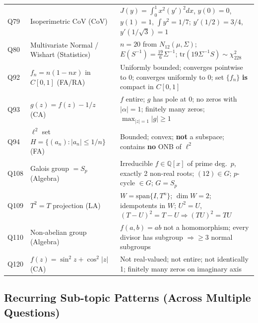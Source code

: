 \documentclass[12pt,a4paper]{article}
\begin{document}
\begin{longtable}{@{}p{0.6cm}p{5.5cm}p{8cm}@{}}
Q79 & Isoperimetric CoV (CoV) & $J(y)=\int_0^1 x^2(y')^2dx$, $y(0)=0$, $y(1)=1$, $\int y^2=1/7$; $y'(1/2)=3/4$, $y'(1/\sqrt{3})=1$ \\
\addlinespace
Q80 & Multivariate Normal / Wishart (Statistics) & $n=20$ from $N_{12}(\mu,\Sigma)$; $E(S^{-1})=\frac{19}{6}\Sigma^{-1}$; $\mathrm{tr}(19\Sigma^{-1}S)\sim\chi^2_{228}$ \\
\addlinespace
Q92 & $f_n=n(1-nx)$ in $C[0,1]$ (FA/RA) & Uniformly bounded; converges pointwise to 0; converges uniformly to 0; set $\{f_n\}$ \textbf{is} compact in $C[0,1]$ \\
\addlinespace
Q93 & $g(z)=f(z)-1/z$ (CA) & $f$ entire; $g$ has pole at 0; no zeros with $|\alpha|=1$; finitely many zeros; $\max_{|z|=1}|g|\ge 1$ \\
\addlinespace
Q94 & $\ell^2$ set $H=\{(a_n):|a_n|\le 1/n\}$ (FA) & Bounded; convex; \textbf{not} a subspace; contains \textbf{no} ONB of $\ell^2$ \\
\addlinespace
Q108 & Galois group $=S_p$ (Algebra) & Irreducible $f\in\mathbb{Q}[x]$ of prime deg.\ $p$, exactly 2 non-real roots; $(12)\in G$; $p$-cycle $\in G$; $G=S_p$ \\
\addlinespace
Q109 & $T^2=T$ projection (LA) & $W=\mathrm{span}\{I,T^n\}$; $\dim W=2$; idempotents in $W$; $U^2=U$, $(T-U)^2=T-U\Rightarrow(TU)^2=TU$ \\
\addlinespace
Q110 & Non-abelian group (Algebra) & $f(a,b)=ab$ not a homomorphism; every divisor has subgroup $\Rightarrow\ge 3$ normal subgroups \\
\addlinespace
Q120 & $f(z)=\sin^2z+\cos^2|z|$ (CA) & Not real-valued; not entire; not identically 1; finitely many zeros on imaginary axis \\
\bottomrule
\end{longtable}

\subsection{Recurring Sub-topic Patterns (Across Multiple Questions)}
\end{document}
